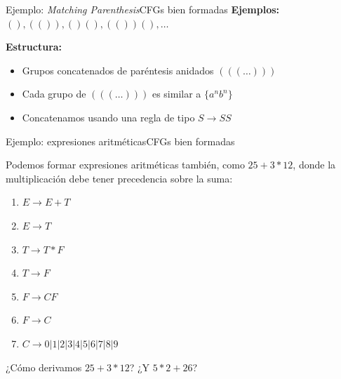 \documentclass[spanish]{beamer}
\begin{document}
\begin{frame}{Ejemplo: \textit{Matching Parenthesis}}{CFGs bien formadas}
        \textbf{Ejemplos:} $(), (()), ()(), (())(), \dots$ \pause
        
        \bigskip

        \textbf{Estructura:}
        \begin{itemize}
            \item Grupos concatenados de paréntesis anidados $(((\dots)))$ \pause
            \item Cada grupo de $(((\dots)))$ es similar a $\{a^n b^n\}$ \pause
            \item<7-> Concatenamos usando una regla de tipo $S \to SS$
        \end{itemize}

        \bigskip



\end{frame}

\begin{frame}{Ejemplo: expresiones aritméticas}{CFGs bien formadas}

    Podemos formar expresiones aritméticas también, como $25+3*12$, donde la multiplicación debe tener precedencia sobre la suma: \pause

    \begin{enumerate}
        \item $E \to E + T$ \pause
        \item $E \to T$ \pause
        \item $T \to T * F$ \pause
        \item $T \to F$ \pause
        \item $F \to CF$ \pause
        \item $F \to C$ \pause
        \item $C \to 0|1|2|3|4|5|6|7|8|9$
    \end{enumerate}

    \pause

    ¿Cómo derivamos $25 + 3 * 12$? \pause ¿Y $5 * 2 + 26$?
    
\end{frame}
\end{document}
